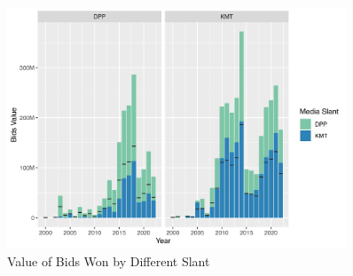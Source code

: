 \documentclass[
  10pt,
  ignorenonframetext,
  aspectratio=169,
]{beamer}
\begin{document}
\begin{frame}
\begin{figure}
\centering
\includegraphics[width=0.9\textwidth,height=\textheight]{./graphs/partyBidPreference-2.png}
\caption{Value of Bids Won by Different Slant}
\end{figure}
\end{frame}
\end{document}

